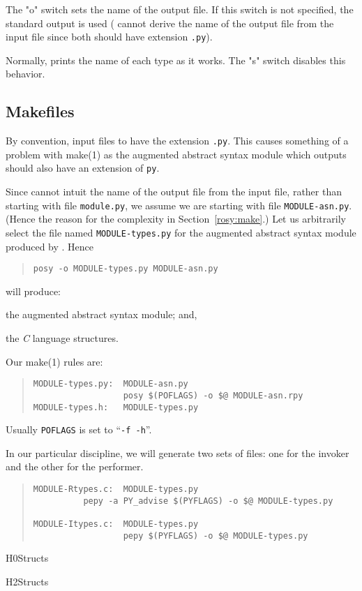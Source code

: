 The \switch"o" switch sets the name of the output file.
If this switch is not specified,
the standard output is used
( cannot derive the name of the output file from the input file
since both should have extension \verb".py").

Normally,  prints the name of each type as it works.
The \switch"s" switch disables this behavior.

\subsection	{Makefiles}\label{posy:make}
By convention,
input files to  have the extension \verb".py".
This causes something of a problem with \man make(1) as the augmented
abstract syntax module which  outputs should also have an extension
of \verb"py".

Since  cannot intuit the name of the output file from the input
file,
rather than starting with file \verb"module.py",
we assume we are starting with file \verb"MODULE-asn.py".
(Hence the reason for the complexity in Section~\ref{rosy:make}.)
Let us arbitrarily select the file named \verb"MODULE-types.py" for the
augmented abstract syntax module produced by .
Hence
\begin{quote}\begin{verbatim}
posy -o MODULE-types.py MODULE-asn.py
\end{verbatim}\end{quote}
will produce:
\begin{describe}
\item[\verb"MODULE-types.py":]	the augmented abstract syntax module;
				and,

\item[\verb"MODULE-types.h":]	the {\em C\/} language structures.
\end{describe}

Our \man make(1) rules are:
\begin{quote}\small\begin{verbatim}
MODULE-types.py:  MODULE-asn.py
                  posy $(POFLAGS) -o $@ MODULE-asn.rpy
MODULE-types.h:   MODULE-types.py
\end{verbatim}\end{quote}
Usually \verb"POFLAGS" is set to ``\verb"-f -h"''.

In our particular discipline,
we will generate two sets of files:
one for the invoker and the other for the performer.
\begin{quote}\small\begin{verbatim}
MODULE-Rtypes.c:  MODULE-types.py
          pepy -a PY_advise $(PYFLAGS) -o $@ MODULE-types.py

MODULE-Itypes.c:  MODULE-types.py
                  pepy $(PYFLAGS) -o $@ MODULE-types.py
\end{verbatim}\end{quote}

\newpage
{}%
	{H0Structs}

\newpage
{}%
	{H2Structs}
